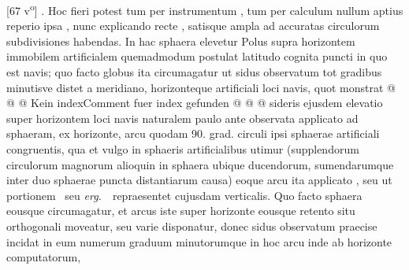 [67 v\textsuperscript{o}] \protect{}\textso{ }\protect{}\protect{}\protect{}.  Hoc fieri potest tum per instrumentum , tum per calculum \pend \pstart {}  nullum aptius reperio ipsa , nunc explicando recte ,  satisque ampla ad accuratas circulorum subdivisiones habendas. In hac sphaera elevetur Polus\protect{} supra horizontem immobilem artificialem quemadmodum postulat latitudo\protect{} cognita puncti in quo est navis\protect{}; quo facto globus ita circumagatur ut sidus\protect{} observatum tot gradibus minutisve distet a meridiano\protect{}, horizonteque artificiali loci navis\protect{}, quot monstrat  @ @ @ Kein indexComment fuer index gefunden @ @ @ sideris ejusdem elevatio super horizontem loci navis\protect{} naturalem paulo ante observata applicato ad sphaeram, ex horizonte, arcu quodam 90. grad. circuli ipsi sphaerae artificiali congruentis, qua et vulgo in sphaeris artificialibus utimur (supplendorum circulorum magnorum alioquin in sphaera ubique ducendorum, sumendarumque inter duo sphaerae puncta distantiarum causa) eoque arcu ita applicato , seu ut portionem  \textbar\ seu  \textit{ erg.}\ \textbar\   repraesentet cujusdam verticalis. Quo facto sphaera  eousque circumagatur, et arcus iste super horizonte eousque retento situ orthogonali moveatur, seu varie disponatur, donec sidus\protect{} observatum praecise incidat in eum numerum graduum minutorumque in hoc arcu inde ab horizonte computatorum, 